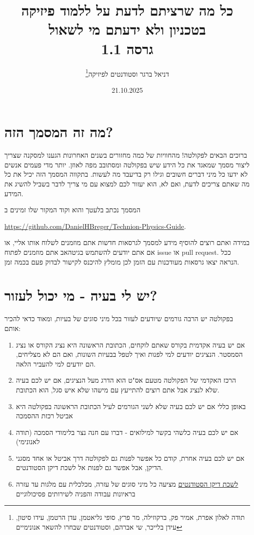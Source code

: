 \documentclass[a4paper,12pt]{article}
\title{כל מה שרציתם לדעת על ללמוד פיזיקה בטכניון ולא ידעתם מי לשאול\\
        \large גרסה 1.1}
\author{דניאל ברגר וסטודנטים לפיזיקה\footnote{תודה לאלון אפרת, אמיר פק, ברקוזילה, מר פרץ, סופי גליאטמן, עדן הרטמן, עידו סיטון, עידן בלייכר, שי אברהם, וסטודנטים שבחרו להשאר אנונימיים}}
\date{21.10.2025}
\begin{document}
\maketitle
\tableofcontents

\newpage

\section{מה זה המסמך הזה?}

ברוכים הבאים לפקולטה! מהחוויות של כמה מחזורים בשנים האחרונות הגענו למסקנה שצריך ליצור מסמך שמאגד את כל הידע שיש בפקולטה ומסתובב מפה לאוזן. יותר מדי פעמים אנשים לא ידעו כל מיני דברים חשובים וגילו רק בדיעבד מה לעשות. בתקווה המסמך הזה יכיל את כל מה שאתם צריכים לדעת, ואם לא, הוא יעזור לכם למצוא עם מי צריך לדבר בשביל להשיג את המידע.

המסמך נכתב בלעטך והוא וקוד המקור שלו זמינים ב 

\textenglish{\url{https://github.com/DanielHBreger/Technion-Physics-Guide}}.

במידה ואתם רוצים להוסיף מידע למסמך לגרסאות חדשות אתם מוזמנים לשלוח אותו אליי, או אם אתם יודעים להשתמש בגיטהאב אתם מוזמנים לפתוח \textenglish{issue} או \textenglish{pull request}. ככל הנראה יצאו גרסאות מעודכנות עם הזמן לכן מומלץ להיכנס לקישור לבדוק פעם בכמה זמן.

\section{יש לי בעיה - מי יכול לעזור?}

בפקולטה יש הרבה גורמים שיודעים לעזור בכל מיני סוגים של בעיות, ומאוד כדאי להכיר אותם:

\begin{enumerate}
    \item אם יש בעיה אקדמית בקורס שאתם לוקחים, הכתובת הראשונה היא נציג הקורס או נציג הסמסטר. הנציגים יודעים למי לפנות ואיך לטפל בבעיות השונות, ואם הם לא מצליחים, הם יודעים למי להעביר הלאה.
    \item הרכז האקדמי של הפקולטה מטעם אס"ט הוא הדרג מעל הנציגים, אם יש לכם בעיה שלא לנציג אבל אתם רוצים להתייעץ עם מישהו שלא איש סגל, הוא הכתובת.
    \item באופן כללי אם יש לכם בעיה שלא לשני הגורמים לעיל הכתובת הראשונה בפקולטה היא אביטל רכזת ההסמכה
    \item אם יש לכם בעיה כלשהי בקשר למילואים - דברו עם חנה נצר בלימודי הסמכה (תודה לאנונימי)
    \item אם יש לכם בעיה אחרת, קודם כל אפשר לפנות גם לפקולטה דרך אביטל או אחד מסגני הדיקן, אבל אפשר גם לפנות אל לשכת דיקן הסטודנטים.
    \item \href{https://dean.technion.ac.il/}{לשכת דיקן הסטודנטים} מציעה כל מיני סוגים של עזרה, מכלכלית עם מלגות עד עזרה בראיונות עבודה והפניה לשירותים פסיכולוגיים
\end{enumerate}
\end{document}
